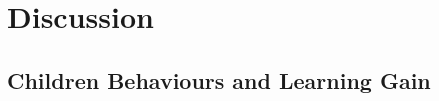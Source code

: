 %
%


\section{Discussion} \label{sec:tutoring_discussion}

\subsection{Children Behaviours and Learning Gain}

